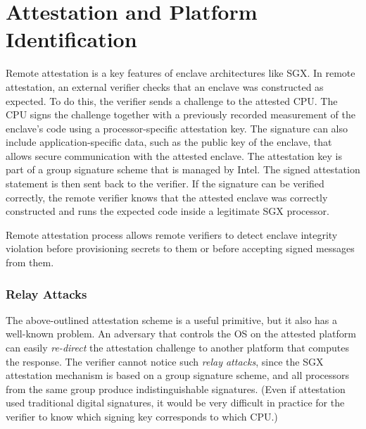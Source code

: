 
\section*{Attestation and Platform Identification}

Remote attestation is a key features of enclave architectures like SGX. In remote attestation, an external verifier checks that an enclave was constructed as expected. To do this, the verifier sends a challenge to the attested CPU. The CPU signs the challenge together with a previously recorded measurement of the enclave's code using a processor-specific attestation key. The signature can also include application-specific data, such as the public key of the enclave, that allows secure communication with the attested enclave. The attestation key is part of a group signature scheme that is managed by Intel. The signed attestation statement is then sent back to the verifier. If the signature can be verified correctly, the remote verifier knows that the attested enclave was correctly constructed and runs the expected code inside a legitimate SGX processor. 

Remote attestation process allows remote verifiers to detect enclave integrity violation before provisioning secrets to them or before accepting signed messages from them.  

\subsubsection*{Relay Attacks}

The above-outlined attestation scheme is a useful primitive, but it also has a well-known problem. 
An adversary that controls the OS on the attested platform can easily \emph{re-direct} the attestation challenge to another platform that computes the response. 
The verifier cannot notice such \emph{relay attacks}, since the SGX attestation mechanism is based on a group signature scheme, and all processors from the same group produce indistinguishable signatures. (Even if attestation used traditional digital signatures, it would be very difficult in practice for the verifier to know which signing key corresponds to which CPU.) 


